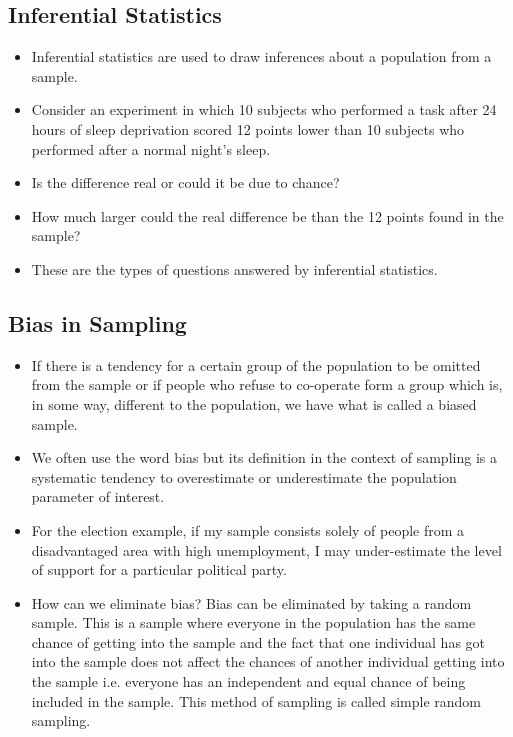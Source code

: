 \documentclass[a4paper,12pt]{article}
\begin{document}

\subsection*{ Inferential Statistics}
\begin{itemize}
	\item Inferential statistics are used to draw inferences about a population from a sample.
	\item Consider an experiment in which 10 subjects who performed a task after 24 hours of sleep
	deprivation scored 12 points lower than 10 subjects who performed after a normal night's sleep.
	\item Is the difference real or could it be due to chance?
	\item How much larger could the real difference be than the 12 points found in the sample?
	\item These are the types of questions answered by inferential statistics.
\end{itemize}

\subsection*{Bias in Sampling}
\begin{itemize}
\item If there is a tendency for a certain group of the population to be omitted from the sample or if people who refuse to co-operate form a group which is, in some way, different to the population, we have what is called a biased sample. 
\item 
We often use the word bias but its definition in the context of sampling is a systematic tendency to overestimate or underestimate the population parameter of interest. 
\item 
For the election example, if my sample consists solely of people from a disadvantaged area with high unemployment, I may under-estimate the level of support for a particular political party. 
\item
How can we eliminate bias? Bias can be eliminated by taking a random sample. This is a sample where everyone in the population has the same chance of getting into the sample and the fact that one individual has got into the sample does not affect the chances of another individual getting into the sample i.e. everyone has an independent and equal chance of being included in the sample. This method of sampling is called simple random sampling.
\end{itemize}
\end{document}

